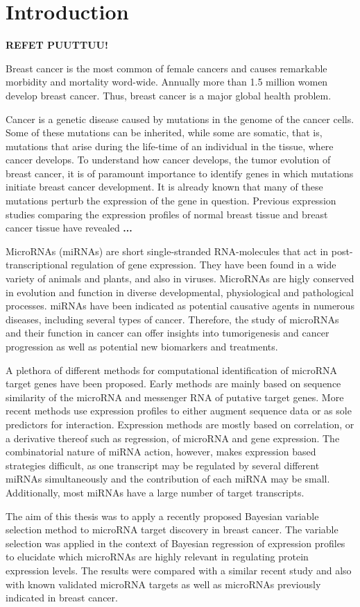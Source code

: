 
\section{Introduction}
\thispagestyle{empty}

\textbf{REFET PUUTTUU!}

Breast cancer is the most common of female cancers and causes remarkable
morbidity and mortality word-wide. Annually more than 1.5 million
women develop breast cancer. Thus, breast cancer is a major global health
problem.

Cancer is a genetic disease caused by mutations in the genome of the cancer
cells. Some of these mutations can be inherited, while some are somatic, that
is, mutations that arise during the life-time of an individual in the tissue,
where cancer develops. To understand how cancer develops, the tumor evolution
of breast cancer, it is of paramount importance to identify genes in which
mutations initiate breast cancer development. It is already known that many of
these mutations perturb the expression of the gene in question. Previous
expression studies comparing the expression profiles of normal breast tissue
and breast cancer tissue have revealed \textbf{...}

MicroRNAs (miRNAs) are short single-stranded RNA-molecules that act in
post-transcriptional regulation of gene expression. They have been found in a
wide variety of animals and plants, and also in viruses. MicroRNAs are higly
conserved in evolution and function in diverse developmental, physiological
and pathological processes. miRNAs have been indicated as potential
causative agents in numerous diseases, including several types of cancer.
Therefore, the study of microRNAs and their function in cancer can offer
insights into tumorigenesis and cancer progression as well as potential new
biomarkers and treatments.

A plethora of different methods for computational identification of microRNA
target genes have been proposed. Early methods are mainly based on sequence
similarity of the microRNA and messenger RNA of putative target genes. More
recent methods use expression profiles to either augment sequence data or as
sole predictors for interaction. Expression methods are mostly based on
correlation, or a derivative thereof such as regression, of microRNA and gene
expression. The combinatorial nature of miRNA action, however, makes
expression based strategies difficult, as one transcript may be regulated by
several different miRNAs simultaneously and the contribution of each miRNA may
be small. Additionally, most miRNAs have a large number of target transcripts.

The aim of this thesis was to apply a recently proposed Bayesian variable
selection method to microRNA target discovery in breast cancer. The variable
selection was applied in the context of Bayesian regression of expression
profiles to elucidate which microRNAs are highly relevant in regulating
protein expression levels. The results were compared with a similar recent
study and also with known validated microRNA targets as well as microRNAs
previously indicated in breast cancer.
